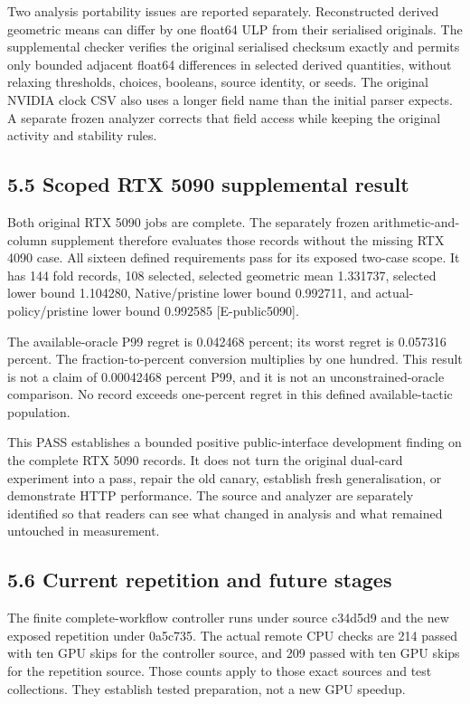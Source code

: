 \documentclass[11pt,a4paper]{article}
\begin{document}
Two analysis portability issues are reported separately. Reconstructed derived geometric means can differ by one float64 ULP from their serialised originals. The supplemental checker verifies the original serialised checksum exactly and permits only bounded adjacent float64 differences in selected derived quantities, without relaxing thresholds, choices, booleans, source identity, or seeds. The original NVIDIA clock CSV also uses a longer field name than the initial parser expects. A separate frozen analyzer corrects that field access while keeping the original activity and stability rules.


\subsection*{5.5 Scoped RTX 5090 supplemental result}

Both original RTX 5090 jobs are complete. The separately frozen arithmetic-and-column supplement therefore evaluates those records without the missing RTX 4090 case. All sixteen defined requirements pass for its exposed two-case scope. It has 144 fold records, 108 selected, selected geometric mean 1.331737, selected lower bound 1.104280, Native/\allowbreak{}pristine lower bound 0.992711, and actual-policy/\allowbreak{}pristine lower bound 0.992585 [E-public5090].


The available-oracle P99 regret is 0.042468 percent; its worst regret is 0.057316 percent. The fraction-to-percent conversion multiplies by one hundred. This result is not a claim of 0.00042468 percent P99, and it is not an unconstrained-oracle comparison. No record exceeds one-percent regret in this defined available-tactic population.


This PASS establishes a bounded positive public-interface development finding on the complete RTX 5090 records. It does not turn the original dual-card experiment into a pass, repair the old canary, establish fresh generalisation, or demonstrate HTTP performance. The source and analyzer are separately identified so that readers can see what changed in analysis and what remained untouched in measurement.


\subsection*{5.6 Current repetition and future stages}

The finite complete-workflow controller runs under source c34d5d9 and the new exposed repetition under 0a5c735. The actual remote CPU checks are 214 passed with ten GPU skips for the controller source, and 209 passed with ten GPU skips for the repetition source. Those counts apply to those exact sources and test collections. They establish tested preparation, not a new GPU speedup.
\end{document}
